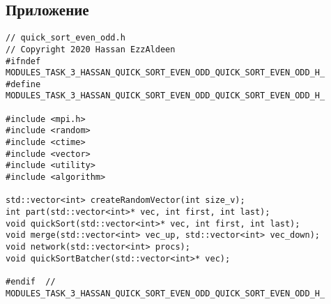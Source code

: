 \documentclass[a4paper]{report}
\begin{document}
\begin{center}
\section*{Приложение}
\end{center}
\begin{lstlisting}
// quick_sort_even_odd.h
// Copyright 2020 Hassan EzzAldeen
#ifndef MODULES_TASK_3_HASSAN_QUICK_SORT_EVEN_ODD_QUICK_SORT_EVEN_ODD_H_
#define MODULES_TASK_3_HASSAN_QUICK_SORT_EVEN_ODD_QUICK_SORT_EVEN_ODD_H_

#include <mpi.h>
#include <random>
#include <ctime>
#include <vector>
#include <utility>
#include <algorithm>

std::vector<int> createRandomVector(int size_v);
int part(std::vector<int>* vec, int first, int last);
void quickSort(std::vector<int>* vec, int first, int last);
void merge(std::vector<int> vec_up, std::vector<int> vec_down);
void network(std::vector<int> procs);
void quickSortBatcher(std::vector<int>* vec);

#endif  // MODULES_TASK_3_HASSAN_QUICK_SORT_EVEN_ODD_QUICK_SORT_EVEN_ODD_H_
\end{lstlisting}
\end{document}
